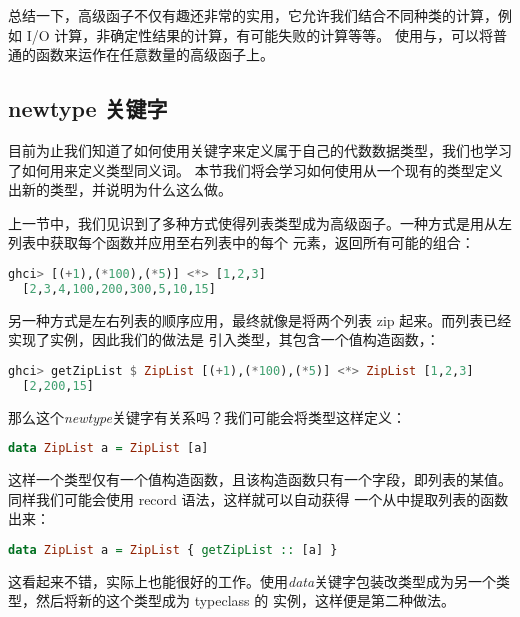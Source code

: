 \documentclass[./main.tex]{subfiles}
\begin{document}
总结一下，高级函子不仅有趣还非常的实用，它允许我们结合不同种类的计算，例如 I/O 计算，非确定性结果的计算，有可能失败的计算等等。
使用\acode{<\$>}与\acode{<*>}，可以将普通的函数来运作在任意数量的高级函子上。

\subsection*{newtype 关键字}

目前为止我们知道了如何使用关键字来定义属于自己的代数数据类型，我们也学习了如何用来定义类型同义词。
本节我们将会学习如何使用从一个现有的类型定义出新的类型，并说明为什么这么做。

上一节中，我们见识到了多种方式使得列表类型成为高级函子。一种方式是用\acode{<*>}从左列表中获取每个函数并应用至右列表中的每个
元素，返回所有可能的组合：

\begin{lstlisting}[language=Haskell]
  ghci> [(+1),(*100),(*5)] <*> [1,2,3]
  [2,3,4,100,200,300,5,10,15]
\end{lstlisting}

另一种方式是左右列表的顺序应用，最终就像是将两个列表 zip 起来。而列表已经实现了实例，因此我们的做法是
引入类型，其包含一个值构造函数，：

\begin{lstlisting}[language=Haskell]
  ghci> getZipList $ ZipList [(+1),(*100),(*5)] <*> ZipList [1,2,3]
  [2,200,15]
\end{lstlisting}

那么这个\textit{newtype}关键字有关系吗？我们可能会将类型这样定义：

\begin{lstlisting}[language=Haskell]
  data ZipList a = ZipList [a]
\end{lstlisting}

这样一个类型仅有一个值构造函数，且该构造函数只有一个字段，即列表的某值。同样我们可能会使用 record 语法，这样就可以自动获得
一个从中提取列表的函数出来：

\begin{lstlisting}[language=Haskell]
  data ZipList a = ZipList { getZipList :: [a] }
\end{lstlisting}

这看起来不错，实际上也能很好的工作。使用\textit{data}关键字包装改类型成为另一个类型，然后将新的这个类型成为 typeclass 的
实例，这样便是第二种做法。
\end{document}
